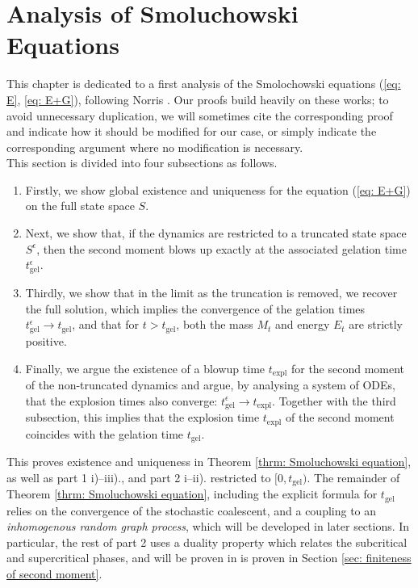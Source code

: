 \section{Analysis of Smoluchowski Equations}\label{sec:SE}  This chapter is dedicated to a first analysis of the Smolochowski equations (\ref{eq: E}, \ref{eq: E+G}), following Norris \cite{N99, N00}. Our proofs build heavily on these works; to avoid unnecessary duplication, we will sometimes cite the corresponding proof and indicate how it should be modified for our case, or simply indicate the corresponding argument where no modification is necessary.
\medskip \\ This section is divided into four subsections as follows.\begin{enumerate}[label=\roman{*}).]
    \item Firstly, we show global existence and uniqueness for the equation (\ref{eq: E+G}) on the full state space $S$.
    \item  Next, we show that, if the dynamics are restricted to a truncated state space $S^\epsilon$, then the second moment blows up exactly at the associated gelation time $t^\epsilon_\mathrm{gel}$.
    \item Thirdly, we show that in the limit as the truncation is removed, we recover the full solution, which implies the convergence of the gelation times $t^\epsilon_\mathrm{gel}\rightarrow t_\mathrm{gel}$, and that for $t>t_\mathrm{gel}$, both the mass $M_t$ and energy $E_t$ are strictly positive.
    \item Finally, we argue the existence of a blowup time $t_\mathrm{expl}$ for the second moment of the non-truncated dynamics and argue, by analysing a system of ODEs, that the explosion times also converge: $t^\epsilon_\mathrm{gel}\rightarrow t_\mathrm{expl}$. Together with the third subsection, this implies that the explosion time $t_\mathrm{expl}$ of the second moment coincides with the gelation time $t_\mathrm{gel}.$
\end{enumerate}  
This proves existence and uniqueness in Theorem \ref{thrm: Smoluchowski equation}, as well as part 1 i)--iii)., and part 2 i--ii). restricted to $[0,t_\mathrm{gel})$. 
The remainder of Theorem \ref{thrm: Smoluchowski equation}, including the explicit formula for $t_\mathrm{gel}$ relies on the convergence of the stochastic coalescent, and a coupling to an \emph{inhomogenous random graph process}, which will be developed in later sections. In particular, the rest of part 2 uses a duality property which relates the subcritical and supercritical phases, and will be proven in is proven in Section \ref{sec: finiteness of second moment}.
